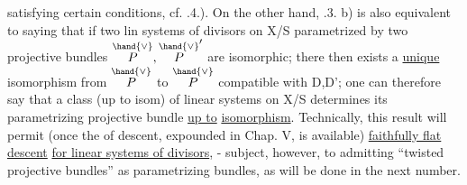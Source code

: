 
satisfying certain conditions, cf. .4.). On the other hand, .3. b)
is  also equivalent to saying that  if two lin systems of divisors
on X/S  parametrized by two projective bundles $\overset{\hand{\vee}}{P},\overset{\hand{\vee}}{P}'$ are isomorphic;
there then exists a \uline{unique} isomorphism from $\overset{\hand{\vee}}{P}$ to $\overset{\hand{\vee}}{P}$ compatible with D,D';
one can therefore say that a class (up to isom) of linear systems on
X/S determines its parametrizing projective bundle \uline{up to} 
\uline{isomorphism}. Technically, this result will permit (once the
 of descent, expounded in Chap. V, is available) \uline{faithfully flat descent}
\uline{for linear systems of divisors}, - subject,
 however, to admitting  ``twisted projective
bundles'' as parametrizing bundles, as will be done in the next  number.

